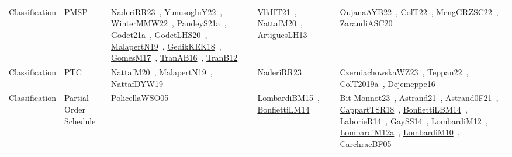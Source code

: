 {\begin{longtable}{lp{3cm}>{\raggedright\arraybackslash}p{6cm}>{\raggedright\arraybackslash}p{6cm}>{\raggedright\arraybackslash}p{8cm}}
Classification & PMSP & \href{../works/NaderiRR23.pdf}{NaderiRR23}~\cite{NaderiRR23}, \href{../works/YunusogluY22.pdf}{YunusogluY22}~\cite{YunusogluY22}, \href{../works/WinterMMW22.pdf}{WinterMMW22}~\cite{WinterMMW22}, \href{../works/PandeyS21a.pdf}{PandeyS21a}~\cite{PandeyS21a}, \href{../works/Godet21a.pdf}{Godet21a}~\cite{Godet21a}, \href{../works/GodetLHS20.pdf}{GodetLHS20}~\cite{GodetLHS20}, \href{../works/MalapertN19.pdf}{MalapertN19}~\cite{MalapertN19}, \href{../works/GedikKEK18.pdf}{GedikKEK18}~\cite{GedikKEK18}, \href{../works/GomesM17.pdf}{GomesM17}~\cite{GomesM17}, \href{../works/TranAB16.pdf}{TranAB16}~\cite{TranAB16}, \href{../works/TranB12.pdf}{TranB12}~\cite{TranB12} & \href{../works/VlkHT21.pdf}{VlkHT21}~\cite{VlkHT21}, \href{../works/NattafM20.pdf}{NattafM20}~\cite{NattafM20}, \href{../works/ArtiguesLH13.pdf}{ArtiguesLH13}~\cite{ArtiguesLH13} & \href{../works/OujanaAYB22.pdf}{OujanaAYB22}~\cite{OujanaAYB22}, \href{../works/ColT22.pdf}{ColT22}~\cite{ColT22}, \href{../works/MengGRZSC22.pdf}{MengGRZSC22}~\cite{MengGRZSC22}, \href{../works/ZarandiASC20.pdf}{ZarandiASC20}~\cite{ZarandiASC20}\\
Classification & PTC & \href{../works/NattafM20.pdf}{NattafM20}~\cite{NattafM20}, \href{../works/MalapertN19.pdf}{MalapertN19}~\cite{MalapertN19}, \href{../works/NattafDYW19.pdf}{NattafDYW19}~\cite{NattafDYW19} & \href{../works/NaderiRR23.pdf}{NaderiRR23}~\cite{NaderiRR23} & \href{../works/CzerniachowskaWZ23.pdf}{CzerniachowskaWZ23}~\cite{CzerniachowskaWZ23}, \href{../works/Teppan22.pdf}{Teppan22}~\cite{Teppan22}, \href{../works/ColT2019a.pdf}{ColT2019a}~\cite{ColT2019a}, \href{../works/Dejemeppe16.pdf}{Dejemeppe16}~\cite{Dejemeppe16}\\
Classification & Partial Order Schedule & \href{../works/PolicellaWSO05.pdf}{PolicellaWSO05}~\cite{PolicellaWSO05} & \href{../works/LombardiBM15.pdf}{LombardiBM15}~\cite{LombardiBM15}, \href{../works/BonfiettiLM14.pdf}{BonfiettiLM14}~\cite{BonfiettiLM14} & \href{../works/Bit-Monnot23.pdf}{Bit-Monnot23}~\cite{Bit-Monnot23}, \href{../works/Astrand21.pdf}{Astrand21}~\cite{Astrand21}, \href{../works/Astrand0F21.pdf}{Astrand0F21}~\cite{Astrand0F21}, \href{../works/CappartTSR18.pdf}{CappartTSR18}~\cite{CappartTSR18}, \href{../works/BonfiettiLBM14.pdf}{BonfiettiLBM14}~\cite{BonfiettiLBM14}, \href{../works/LaborieR14.pdf}{LaborieR14}~\cite{LaborieR14}, \href{../works/GaySS14.pdf}{GaySS14}~\cite{GaySS14}, \href{../works/LombardiM12.pdf}{LombardiM12}~\cite{LombardiM12}, \href{../works/LombardiM12a.pdf}{LombardiM12a}~\cite{LombardiM12a}, \href{../works/LombardiM10.pdf}{LombardiM10}~\cite{LombardiM10}, \href{../works/CarchraeBF05.pdf}{CarchraeBF05}~\cite{CarchraeBF05}\\

\end{longtable}}
